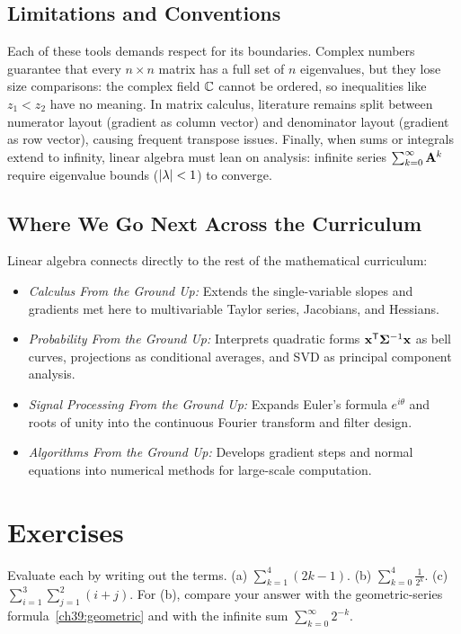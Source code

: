 \subsection*{Limitations and Conventions}

Each of these tools demands respect for its boundaries. Complex numbers guarantee that every
$n\times n$ matrix has a full set of $n$ eigenvalues, but they lose size comparisons:
the complex field $\mathbb{C}$ cannot be ordered, so inequalities like $z_1 < z_2$ have no meaning.
In matrix calculus, literature remains split between numerator layout (gradient as column vector)
and denominator layout (gradient as row vector), causing frequent transpose issues. Finally,
when sums or integrals extend to infinity, linear algebra must lean on analysis: infinite series
$\sum_{k=0}^\infty \mathbf{A}^k$ require eigenvalue bounds ($\lvert\lambda\rvert < 1$) to converge.

\subsection*{Where We Go Next Across the Curriculum}

Linear algebra connects directly to the rest of the mathematical curriculum:
\begin{itemize}
  \item \emph{Calculus From the Ground Up:} Extends the single-variable slopes and gradients
  met here to multivariable Taylor series, Jacobians, and Hessians.
  \item \emph{Probability From the Ground Up:} Interprets quadratic forms
  $\mathbf{x}^{\mathsf{T}}\mathbf{\Sigma}^{-1}\mathbf{x}$ as bell curves, projections as conditional
  averages, and SVD as principal component analysis.
  \item \emph{Signal Processing From the Ground Up:} Expands Euler's formula $e^{i\theta}$ and roots
  of unity into the continuous Fourier transform and filter design.
  \item \emph{Algorithms From the Ground Up:} Develops gradient steps and normal
  equations into numerical methods for large-scale computation.
\end{itemize}

\section{Exercises}
\label{ch39:exercises}

\begin{exercise}
\label{ch39:ex1}
Evaluate each by writing out the terms.
(a) $\displaystyle\sum_{k=1}^{4}(2k-1)$.\quad
(b) $\displaystyle\sum_{k=0}^{4} \tfrac{1}{2^k}$.\quad
(c) $\displaystyle\sum_{i=1}^{3}\sum_{j=1}^{2} (i + j)$.
For (b), compare your answer with the geometric-series formula~\eqref{ch39:geometric} and with the
infinite sum $\sum_{k=0}^\infty 2^{-k}$.
\end{exercise}

